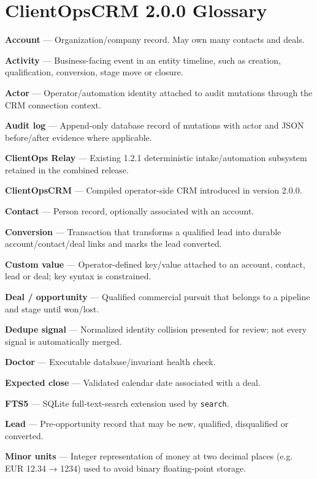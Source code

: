\documentclass[
]{article}
\author{}
\date{}
\begin{document}
\section{ClientOpsCRM 2.0.0 Glossary}\label{clientopscrm-200-glossary}

\textbf{Account} --- Organization/company record. May own many contacts
and deals.

\textbf{Activity} --- Business-facing event in an entity timeline, such
as creation, qualification, conversion, stage move or closure.

\textbf{Actor} --- Operator/automation identity attached to audit
mutations through the CRM connection context.

\textbf{Audit log} --- Append-only database record of mutations with
actor and JSON before/after evidence where applicable.

\textbf{ClientOps Relay} --- Existing 1.2.1 deterministic
intake/automation subsystem retained in the combined release.

\textbf{ClientOpsCRM} --- Compiled operator-side CRM introduced in
version 2.0.0.

\textbf{Contact} --- Person record, optionally associated with an
account.

\textbf{Conversion} --- Transaction that transforms a qualified lead
into durable account/contact/deal links and marks the lead converted.

\textbf{Custom value} --- Operator-defined key/value attached to an
account, contact, lead or deal; key syntax is constrained.

\textbf{Deal / opportunity} --- Qualified commercial pursuit that
belongs to a pipeline and stage until won/lost.

\textbf{Dedupe signal} --- Normalized identity collision presented for
review; not every signal is automatically merged.

\textbf{Doctor} --- Executable database/invariant health check.

\textbf{Expected close} --- Validated calendar date associated with a
deal.

\textbf{FTS5} --- SQLite full-text-search extension used by
\texttt{search}.

\textbf{Lead} --- Pre-opportunity record that may be new, qualified,
disqualified or converted.

\textbf{Minor units} --- Integer representation of money at two decimal
places (e.g. EUR 12.34 → 1234) used to avoid binary floating-point
storage.
\end{document}

